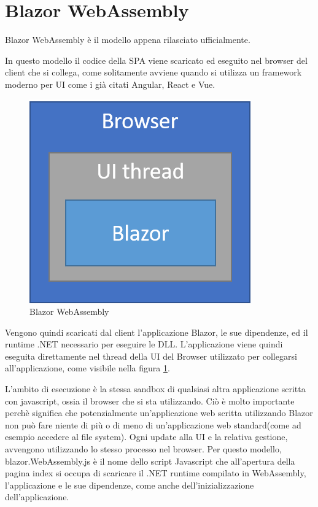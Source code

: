 \pagebreak

\section{Blazor WebAssembly}\label{sez:bwa}
Blazor WebAssembly \`e il modello appena rilasciato ufficialmente\cite{blazorWebAssemblyRelease}.

In questo modello il codice della SPA viene scaricato ed eseguito nel browser del client che si collega, come solitamente avviene quando si utilizza un framework moderno per UI come i gi\`a citati Angular, React e Vue.

\begin{figure}[H]
	\centerline{\includegraphics[scale=0.6]{figure/blazor-WebAssembly.png}}
	\caption{Blazor WebAssembly}
	\label{fig:BlazorWebAssembly}
\end{figure}

Vengono quindi scaricati dal client l'applicazione Blazor, le sue dipendenze, ed il runtime .NET necessario per eseguire le DLL.
L'applicazione viene quindi eseguita direttamente nel thread della UI del Browser utilizzato per collegarsi all'applicazione, come visibile nella figura \ref{fig:BlazorWebAssembly}.

L'ambito di esecuzione \`e la stessa sandbox di qualsiasi altra applicazione scritta con javascript, ossia il browser che si sta utilizzando.
Ci\`o \`e molto importante perch\`e significa che potenzialmente un'applicazione web scritta utilizzando Blazor non pu\`o fare niente di pi\`u o di meno di un'applicazione web standard(come ad esempio accedere al file system).
Ogni update alla UI e la relativa gestione, avvengono utilizzando lo stesso processo nel browser.
Per questo modello, blazor.WebAssembly.js \`e il nome dello script Javascript che all'apertura della pagina index si occupa di scaricare il .NET runtime compilato in WebAssembly, l'applicazione e le sue dipendenze, come anche dell'inizializzazione dell'applicazione.

